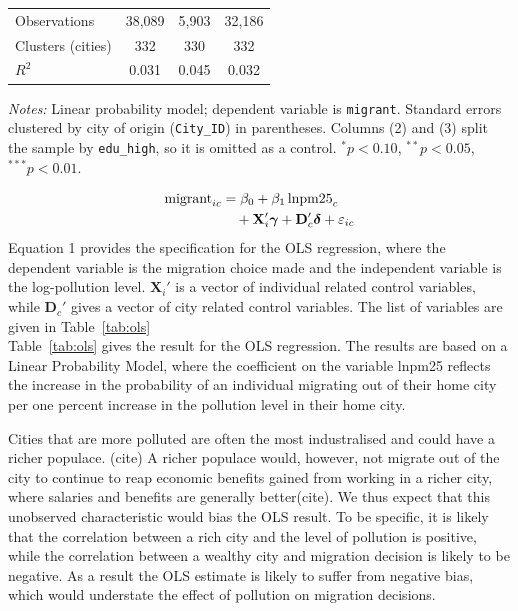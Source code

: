 \documentclass[11pt,twocolumn]{article}
\begin{document}
\begin{table}[!t]
\begin{threeparttable}
\begin{tabular}{lccc}
\midrule
Observations & 38,089 & 5,903 & 32,186 \\
Clusters (cities) & 332 & 330 & 332 \\
$R^2$ & 0.031 & 0.045 & 0.032 \\
\bottomrule
\end{tabular}
\begin{tablenotes}\footnotesize
\item \textit{Notes:} Linear probability model; dependent variable is \texttt{migrant}. Standard errors clustered by city of origin (\texttt{City\_ID}) in parentheses. Columns (2) and (3) split the sample by \texttt{edu\_high}, so it is omitted as a control. $^{*}p<0.10$, $^{**}p<0.05$, $^{***}p<0.01$.
\end{tablenotes}
\end{threeparttable}
\end{table}

\begin{align}
  \text{migrant}_{ic} &= \beta_0 + \beta_1 \,\text{lnpm25}_c \notag \\
  &\quad + \mathbf{X}_i'\boldsymbol{\gamma} + \mathbf{D}_c'\boldsymbol{\delta} + \varepsilon_{ic} \label{eq:ols}
\end{align}
Equation 1 provides the specification for the OLS regression, where the dependent variable is the migration choice made and the independent variable is the log-pollution level. $\mathbf{X}_i'$ is a vector of  individual related control variables, while $\mathbf{D}_c'$ gives a vector of city related control variables. The list of variables are given in Table~\ref{tab:ols}\\

Table~\ref{tab:ols} gives the result for the OLS regression. The results are based on a Linear Probability Model, where the coefficient on the variable lnpm25 reflects the increase in the probability of an individual migrating out of their home city per one percent increase in the pollution level in their home city.

Cities that are more polluted are often the most industralised and could have a richer populace. (cite) A richer populace would, however, not migrate out of the city to continue to reap economic benefits gained from working in a richer city, where salaries and benefits are generally better(cite). We thus expect that this unobserved characteristic would bias the OLS result. To be specific, it is likely that the correlation between a rich city and the level of pollution is positive, while the correlation between a wealthy city and migration decision is likely to be negative. As a result the OLS estimate is likely to suffer from negative bias, which would understate the effect of pollution on migration decisions.\\
\end{document}
